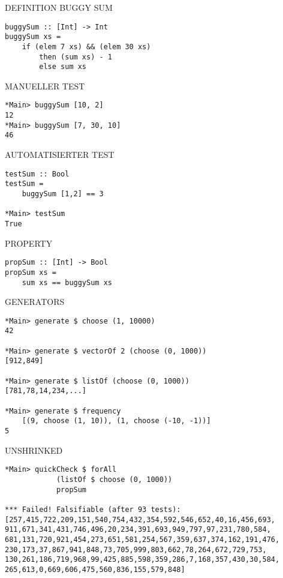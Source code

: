 \newpage

DEFINITION BUGGY SUM

\begin{verbatim}
buggySum :: [Int] -> Int
buggySum xs = 
    if (elem 7 xs) && (elem 30 xs)
        then (sum xs) - 1
        else sum xs
\end{verbatim}

MANUELLER TEST

\begin{verbatim}
*Main> buggySum [10, 2]
12
*Main> buggySum [7, 30, 10]
46
\end{verbatim}

AUTOMATISIERTER TEST

\begin{verbatim}
testSum :: Bool
testSum = 
    buggySum [1,2] == 3

*Main> testSum
True
\end{verbatim}

PROPERTY

\begin{verbatim}
propSum :: [Int] -> Bool
propSum xs = 
    sum xs == buggySum xs
\end{verbatim}

\newpage

GENERATORS

\begin{verbatim}
*Main> generate $ choose (1, 10000)
42

*Main> generate $ vectorOf 2 (choose (0, 1000))
[912,849]

*Main> generate $ listOf (choose (0, 1000))
[781,78,14,234,...]

*Main> generate $ frequency
    [(9, choose (1, 10)), (1, choose (-10, -1))]
5
\end{verbatim}

UNSHRINKED

\begin{verbatim}
*Main> quickCheck $ forAll 
            (listOf $ choose (0, 1000)) 
            propSum

*** Failed! Falsifiable (after 93 tests):  
[257,415,722,209,151,540,754,432,354,592,546,652,40,16,456,693,
911,671,341,431,746,496,20,234,391,693,949,797,97,231,780,584,
681,131,720,921,454,273,651,581,254,567,359,637,374,162,191,476,
230,173,37,867,941,848,73,705,999,803,662,78,264,672,729,753,
130,261,186,719,968,99,425,885,598,359,286,7,168,357,430,30,584,
265,613,0,669,606,475,560,836,155,579,848]
\end{verbatim}


